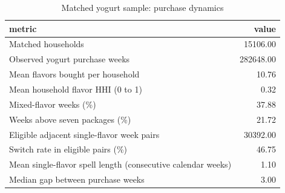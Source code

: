\begin{table}
\caption{Matched yogurt sample: purchase dynamics}
\begin{tabular}{lr}
\toprule
metric & value \\
\midrule
Matched households & 15106.00 \\
Observed yogurt purchase weeks & 282648.00 \\
Mean flavors bought per household & 10.76 \\
Mean household flavor HHI (0 to 1) & 0.32 \\
Mixed-flavor weeks (\%) & 37.88 \\
Weeks above seven packages (\%) & 21.72 \\
Eligible adjacent single-flavor week pairs & 30392.00 \\
Switch rate in eligible pairs (\%) & 46.75 \\
Mean single-flavor spell length (consecutive calendar weeks) & 1.10 \\
Median gap between purchase weeks & 3.00 \\
\bottomrule
\end{tabular}
\end{table}
